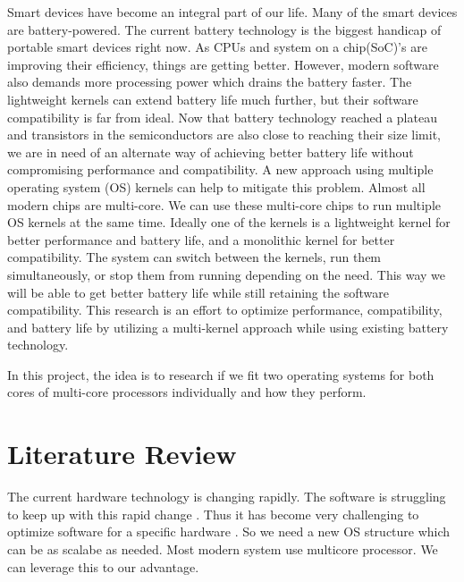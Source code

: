 \documentclass[11pt]{article}       %
\begin{document}
Smart devices have become an integral part of our life. Many of the smart devices are battery-powered. The current battery technology is the biggest handicap of portable smart devices right now. As CPUs and system on a chip(SoC)’s are improving their efficiency, things are getting better. However, modern software also demands more processing power which drains the battery faster. The lightweight kernels can extend battery life much further, but their software compatibility is far from ideal. Now that battery technology reached a plateau and transistors in the semiconductors are also close to reaching their size limit, we are in need of an alternate way of achieving better battery life without compromising performance and compatibility. A new approach using multiple operating system (OS) kernels can help to mitigate this problem. Almost all modern chips are multi-core. We can use these multi-core chips to run multiple OS kernels at the same time. Ideally one of the kernels is a lightweight kernel for better performance and battery life, and a monolithic kernel for better compatibility. The system can switch between the kernels, run them simultaneously, or stop them from running depending on the need. This way we will be able to get better battery life while still retaining the software compatibility. This research is an effort to optimize performance, compatibility, and battery life by utilizing a multi-kernel approach while using existing battery technology. 

In this project, the idea is to research if we fit two operating systems for both cores of multi-core processors individually and how they perform.


\section{Literature Review} \label{litrev}
The current hardware technology is changing rapidly. The software is struggling to keep up with  this rapid change . Thus it has become very challenging to optimize software for a specific hardware\cite{DEL02} . So we need a new OS structure which can be as scalabe as needed. Most modern system use multicore processor. We can leverage this to our advantage.
\end{document}
